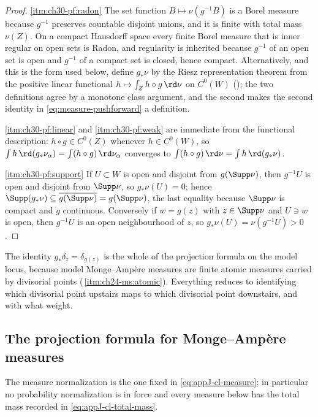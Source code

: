 \begin{proof}
\cref{itm:ch30-pf:radon}  The set function $B\mapsto\nu(g^{-1}B)$ is a
Borel measure because $g^{-1}$ preserves countable disjoint unions, and it
is finite with total mass $\nu(Z)$.  On a compact Hausdorff space every
finite Borel measure that is inner regular on open sets is Radon, and
regularity is inherited because $g^{-1}$ of an open set is open and
$g^{-1}$ of a compact set is closed, hence compact.  Alternatively, and
this is the form used below, define $g_*\nu$ by the Riesz representation
theorem from the positive linear functional
$h\mapsto\int_Z h\circ g\,\rd\nu$ on $C^0(W)$
(); the two definitions agree by a monotone class
argument, and the second makes the second identity in
\eqref{eq:measure-pushforward} a definition.

\cref{itm:ch30-pf:linear} and \cref{itm:ch30-pf:weak} are immediate from the
functional description: $h\circ g\in C^0(Z)$ whenever $h\in C^0(W)$, so
$\int h\,\rd(g_*\nu_\alpha)=\int(h\circ g)\,\rd\nu_\alpha$ converges to
$\int(h\circ g)\,\rd\nu=\int h\,\rd(g_*\nu)$.

\cref{itm:ch30-pf:support}  If $U\subset W$ is open and disjoint from
$g(\Supp\nu)$, then $g^{-1}U$ is open and disjoint from $\Supp\nu$, so
$g_*\nu(U)=0$; hence $\Supp(g_*\nu)\subseteq\overline{g(\Supp\nu)}
=g(\Supp\nu)$, the last equality because $\Supp\nu$ is compact and $g$
continuous.  Conversely if $w=g(z)$ with $z\in\Supp\nu$ and $U\ni w$
is open, then $g^{-1}U$ is an open neighbourhood of $z$, so
$g_*\nu(U)=\nu(g^{-1}U)>0$.
\end{proof}

The identity $g_*\delta_z=\delta_{g(z)}$ is the whole of the projection
formula on the model locus, because model Monge--Amp\`ere measures are finite
atomic measures carried by divisorial points
(\,\cref{itm:ch24-ms:atomic}).  Everything
reduces to identifying which divisorial point upstairs maps to which
divisorial point downstairs, and with what weight.

\subsection{The projection formula for Monge--Amp\`ere measures}
\label{sec:ch30-finite-projection}

The measure normalization is the one fixed in \eqref{eq:appJ-cl-measure};
in particular no probability normalization is in force and every measure
below has the total mass recorded in \eqref{eq:appJ-cl-total-mass}.

